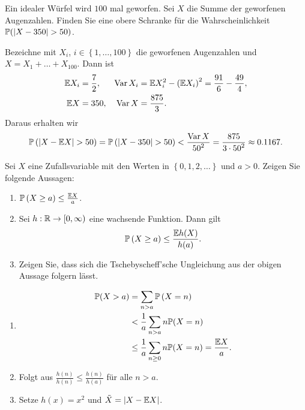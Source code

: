  Ein idealer Würfel
wird $100$ mal geworfen. Sei $X$ die Summe der geworfenen Augenzahlen. Finden
Sie eine obere Schranke für die Wahrscheinlichkeit $\mathbb P( | X - 350 | > 50)$. 

\solution Bezeichne mit $X_i$, $i\in \left\{ 1,\dots ,100 \right\}$ die geworfenen
Augenzahlen und $X= X_1 +\dots + X_{100}$. Dann ist
\begin{align*}
    \mathbb E X_i &= \frac{7}{2}, & \operatorname{Var} X_i &= \mathbb E X_i^{2} - \left( \mathbb E X_i \right)^{2} = \frac{91}{6} - \frac{49}{4}, \\
    \mathbb E X &= 350, & \operatorname{Var} X &= \frac{875}{3}.
\end{align*}
Daraus erhalten wir
\begin{equation*}
    \mathbb P \left( | X - \mathbb E X | > 50 \right) = \mathbb P \left( | X - 350  | > 50 \right) < \frac{\operatorname{Var} X}{ {50}^2 } = \frac{875}{ 3 \cdot {50}^{2}} \approx 0.1167.
\end{equation*}

 Sei $X$ eine Zufallsvariable
mit den Werten in $\left\{ 0,1,2,\dots \right\}$ und $a> 0$. Zeigen Sie folgende Aussagen:
\begin{enumerate}
    \item $\mathbb P \left( X \geq a \right) \leq \frac{\mathbb E X}{a}$.

    \item Sei $h: \mathbb R \to [0,\infty)$ eine wachsende Funktion. Dann gilt
        \begin{equation*}
            \mathbb P \left( X \geq a \right) \leq \frac{\mathbb E h(X)}{ h(a)}. 
        \end{equation*}

    \item Zeigen Sie, dass sich die Tschebyscheff'sche Ungleichung aus der
        obigen Aussage folgern lässt. 
\end{enumerate}

\solution
\begin{enumerate}
    \item \begin{align*}
            \mathbb P( X > a ) &= \sum_{n > a} \mathbb P \left( X = n \right) \\
            &< \frac{1}{a} \sum_{n>a} n \mathbb P( X = n ) \\
            &\leq \frac{1}{a} \sum_{n \geq 0} n \mathbb P(X = n) = \frac{\mathbb E X}{ a}.
        \end{align*}
    \item Folgt aus $\frac{h(n)}{h(n)} \leq \frac{h(n)}{h(a)}$ für alle $n>a$.
    \item Setze $h(x) = x^{2}$ und $\tilde X = | X - \mathbb E X |$.
\end{enumerate}


